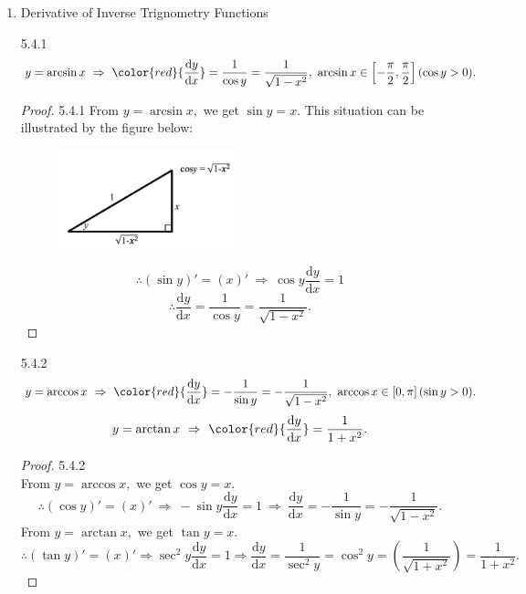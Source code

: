 \documentclass[12pt, a4paper]{article}
\begin{document}
\begin{enumerate}
\begin{example}{5.4.3}{}
        \noindent\rule[0.1pt]{\textwidth}{1pt}
        $$(2x)'+\left(2y\frac{\mathrm{d}y}{\mathrm{d}x}\right)'=(0)'\Rightarrow2+\left((2y)'\frac{\mathrm{d}y}{\mathrm{d}x}+2y\left(\frac{\mathrm{d}y}{\mathrm{d}x}\right)'\right)=0\Rightarrow2+2\left(\frac{\mathrm{d}y}{\mathrm{d}x}\right)^2+2y\frac{\mathrm{d}^2y}{\mathrm{d}x^2}=0$$
        $$\frac{\mathrm{d}^2y}{\mathrm{d}x^2}=\frac{-2-2\left(\frac{\mathrm{d}y}{\mathrm{d}x}\right)^2}{2y}=\frac{-2-2\left(-\frac{x}{y}\right)^2}{2y}.$$
    \end{example}
    \item Derivative of Inverse Trignometry Functions
    \begin{theorem}{5.4.1}{}
        $$y=\arcsin x\ \Rightarrow\ {\color{red}{\frac{\mathrm{d}y}{\mathrm{d}x}}=\frac{1}{\cos y}=\frac{1}{\sqrt{1-x^2}}},\ \arcsin x\in\left[-\frac{\pi}{2},\frac{\pi}{2}\right](\cos y>0).$$
        \begin{proof}{5.4.1}{}
            From $y=\arcsin x,$ we get $\sin y=x$. This situation can be illustrated by the figure below: 
            \begin{figure}[H]
                \centering 
                \includegraphics[width=0.5\textwidth]{Fig.5.5.jpg} 
            \end{figure}
            $$\therefore (\sin y)'=(x)'\ \Rightarrow\ \cos y\frac{\mathrm{d}y}{\mathrm{d}x}=1$$
            $$\therefore \frac{\mathrm{d}y}{\mathrm{d}x}=\frac{1}{\cos y}=\frac{1}{\sqrt{1-x^2}}.$$
        \end{proof}
    \end{theorem}
    \begin{theorem}{5.4.2}{}
        $$y=\arccos x\ \Rightarrow\ {\color{red}{\frac{\mathrm{d}y}{\mathrm{d}x}}=-\frac{1}{\sin y}=-\frac{1}{\sqrt{1-x^2}}},\ \arccos x\in\left[0,\pi\right](\sin y>0).$$
        $$y=\arctan x\ \Rightarrow\ {\color{red}{\frac{\mathrm{d}y}{\mathrm{d}x}}=\frac{1}{1+x^2}}.$$
        \begin{proof}{5.4.2}{}
            {\color{green}{(Hint: Try to visualize a similar diagram as in proof 4.1.)}}\\
            From $y=\arccos x,$ we get $\cos y=x$. 
            $$\therefore (\cos y)'=(x)'\ \Rightarrow\ -\sin y\frac{\mathrm{d}y}{\mathrm{d}x}=1\ \Rightarrow\ \frac{\mathrm{d}y}{\mathrm{d}x}=-\frac{1}{\sin y}=-\frac{1}{\sqrt{1-x^2}}.$$
            From $y=\arctan x,$ we get $\tan y=x$.
            $$\therefore (\tan y)'=(x)'\Rightarrow\sec^2 y\frac{\mathrm{d}y}{\mathrm{d}x}=1\Rightarrow\frac{\mathrm{d}y}{\mathrm{d}x}=\frac{1}{\sec^2 y}=\cos^2 y=\left(\frac{1}{\sqrt{1+x^2}}\right)=\frac{1}{1+x^2}.$$
        \end{proof}
    \end{theorem}
\end{enumerate}
\end{document}
